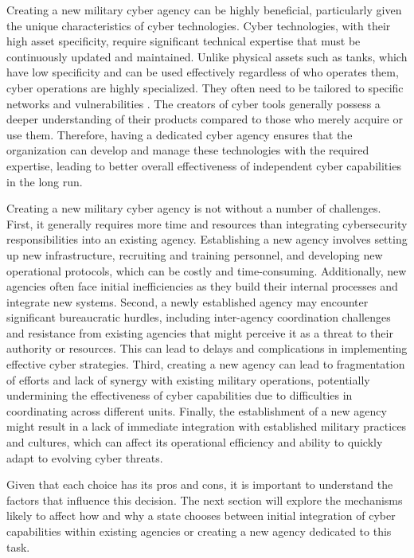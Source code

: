 \documentclass[12pt, letterpaper]{article}
\theoremstyle{plain}
\theoremstyle{remark}
\begin{document}
Creating a new military cyber agency can be highly beneficial, particularly given the unique characteristics of cyber technologies. Cyber technologies, with their high asset specificity, require significant technical expertise that must be continuously updated and maintained. Unlike physical assets such as tanks, which have low specificity and can be used effectively regardless of who operates them, cyber operations are highly specialized. They often need to be tailored to specific networks and vulnerabilities \citep{Buchanan2020TNSR}. The creators of cyber tools generally possess a deeper understanding of their products compared to those who merely acquire or use them. Therefore, having a dedicated cyber agency ensures that the organization can develop and manage these technologies with the required expertise, leading to better overall effectiveness of independent cyber capabilities in the long run. 


Creating a new military cyber agency is not without a number of challenges. First, it generally requires more time and resources than integrating cybersecurity responsibilities into an existing agency. Establishing a new agency involves setting up new infrastructure, recruiting and training personnel, and developing new operational protocols, which can be costly and time-consuming. Additionally, new agencies often face initial inefficiencies as they build their internal processes and integrate new systems. Second, a newly established agency may encounter significant bureaucratic hurdles, including inter-agency coordination challenges and resistance from existing agencies that might perceive it as a threat to their authority or resources. This can lead to delays and complications in implementing effective cyber strategies. Third, creating a new agency can lead to fragmentation of efforts and lack of synergy with existing military operations, potentially undermining the effectiveness of cyber capabilities due to difficulties in coordinating across different units. Finally, the establishment of a new agency might result in a lack of immediate integration with established military practices and cultures, which can affect its operational efficiency and ability to quickly adapt to evolving cyber threats.
 

Given that each choice has its pros and cons, it is important to understand the factors that influence this decision. The next section will explore the mechanisms likely to affect how and why a state chooses between initial integration of cyber capabilities within existing agencies or creating a new agency dedicated to this task.
\end{document}
